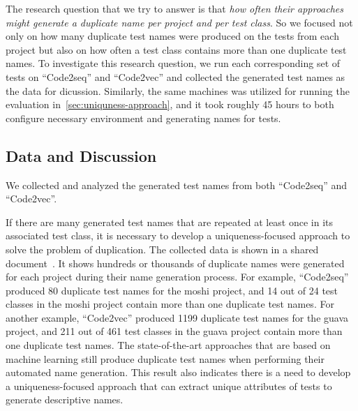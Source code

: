 \begin{appendices}
The research question that we try to answer is that \emph{how often their approaches might generate a duplicate name per project and per test class}.
%
So we focused not only on how many duplicate test names were produced on the tests from each project but also on how often a test class contains more than one duplicate test names.
%
To investigate this research question, we run each corresponding set of tests on \enquote{Code2seq} and \enquote{Code2vec} and collected the generated test names as the data for dicussion.
%
Similarly, the same machines was utilized for running the evaluation in~\cref{sec:uniquness-approach}, and it took roughly \num{45} hours to both configure necessary environment and generating names for tests.


\subsection{Data and Discussion}


We collected and analyzed the generated test names from both \enquote{Code2seq} and \enquote{Code2vec}.
%

If there are many generated test names that are repeated at least once in its associated test class, it is necessary to develop a uniqueness-focused approach to solve the problem of duplication.
%
The collected data is shown in a shared document~\cite{CodeResult}.
%
It shows hundreds or thousands of duplicate names were generated for each project during their name generation process. 
%
For example, \enquote{Code2seq} produced \num{80} duplicate test names for the moshi project, and \num{14} out of \num{24} test classes in the moshi project contain more than one duplicate test names.
%
For another example, \enquote{Code2vec} produced \num{1199} duplicate test names for the guava project, and \num{211} out of \num{461} test classes in the guava project contain more than one duplicate test names.
%
The state-of-the-art approaches that are based on machine learning still produce duplicate test names when performing their automated name generation.
%
This result also indicates there is a need to develop a uniqueness-focused approach that can extract unique attributes of tests to generate descriptive names.


\end{appendices}